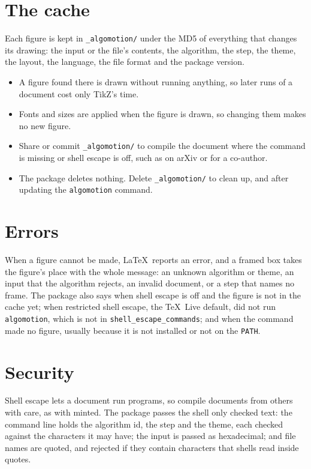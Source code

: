 \documentclass[11pt]{article}
\newcommand\pkg[1]{\textsf{#1}}
\begin{document}
\section{The cache}

Each figure is kept in \texttt{\_algomotion/} under the MD5 of everything
that changes its drawing: the input or the file's contents, the algorithm,
the step, the theme, the layout, the language, the file format and the
package version.

\begin{itemize}
  \item A figure found there is drawn without running anything, so later
    runs of a document cost only TikZ's time.
  \item Fonts and sizes are applied when the figure is drawn, so changing
    them makes no new figure.
  \item Share or commit \texttt{\_algomotion/} to compile the document where
    the command is missing or shell escape is off, such as on arXiv or for a
    co-author.
  \item The package deletes nothing. Delete \texttt{\_algomotion/} to clean
    up, and after updating the \texttt{algomotion} command.
\end{itemize}

\section{Errors}

When a figure cannot be made, \LaTeX\ reports an error, and a framed box
takes the figure's place with the whole message: an unknown algorithm or
theme, an input that the algorithm rejects, an invalid document, or a step
that names no frame. The package also says when shell escape is off and the
figure is not in the cache yet; when restricted shell escape, the \TeX\ Live
default, did not run \texttt{algomotion}, which is not in
\texttt{shell\_escape\_commands}; and when the command made no figure,
usually because it is not installed or not on the \texttt{PATH}.

\section{Security}

Shell escape lets a document run programs, so compile documents from others
with care, as with \pkg{minted}. The package passes the shell only checked
text: the command line holds the algorithm id, the step and the theme, each
checked against the characters it may have; the input is passed as
hexadecimal; and file names are quoted, and rejected if they contain
characters that shells read inside quotes.
\end{document}
